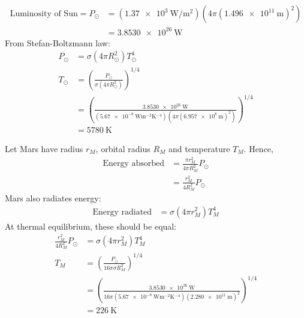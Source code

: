 \begin{solution}
    \begin{subsolution}
        \begin{align*}
            \text{Luminosity of Sun}=P_{\odot}&=(\qty{1.37e3}{\W\per\square\m})(4\pi(\qty{1.496e11}{\m})^2)\\
            &=\qty{3.8530e26}{\W}
        \end{align*}
        From Stefan-Boltzmann law:
        \begin{align*}
            P_{\odot}&=\sigma(4\pi R_{\odot}^2)T_{\odot}^4\\
            T_{\odot}&=\left(\frac{P_{\odot}}{\sigma(4\pi R_{\odot}^2)}\right)^{1/4}\\
            &=\left(\frac{\qty{3.8530e26}{\W}}{(\qty{5.67e-8}{\W\m^{-2}\K^{-4}})(4\pi(\qty{6.957e8}{\m})^2)}\right)^{1/4}\\
            &=\boxed{\qty{5780}{\K}}
        \end{align*}
    \end{subsolution}
    
    \begin{subsolution}
        Let Mars have radius $r_M$, orbital radius $R_M$ and temperature $T_M$. Hence,
        \begin{align*}
            \text{Energy absorbed}&=\frac{\pi r_M^2}{4\pi R_M^2}P_{\odot}\\
            &=\frac{r_M^2}{4 R_M^2}P_{\odot}
        \end{align*}
        Mars also radiates energy:
        \begin{align*}
            \text{Energy radiated}&=\sigma(4\pi r_M^2)T_M^4
        \end{align*}
        At thermal equilibrium, these should be equal:
        \begin{align*}
            \frac{r_M^2}{4 R_M^2}P_{\odot}&=\sigma(4\pi r_M^2)T_M^4\\
            T_M&=\left(\frac{P_{\odot}}{16\pi\sigma R_M^2}\right)^{1/4}\\
            &=\left(\frac{\qty{3.8530e26}{\W}}{16\pi(\qty{5.67e-8}{\W\m^{-2}\K^{-4}})(\qty{2.280e11}{\m})^2}\right)^{1/4}\\
            &=\boxed{\qty{226}{\K}}
        \end{align*}
    \end{subsolution}
\end{solution}

